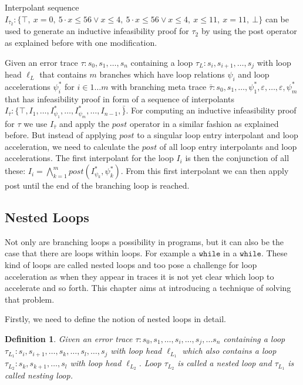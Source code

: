 \documentclass{article}
\newcounter{example}[section]
\newtheorem{mydef}{Definition}
\newcommand\mycom[1]{}
\newcommand\mycom[1]{#1}
\newcommand{\ts}[1]{\mycom{\todo[color=green!40,inline]{\small TS: #1}}}
\begin{document}
Interpolant sequence $I_{\bar{\tau}_2}: \{ \top,\ x = 0,\ 5 \cdot x \leq 56 \lor x \leq 4,\ 5 \cdot x \leq 56 \lor x \leq 4,\ x \leq 11,\ x = 11,\ \bot\}$ can be used to generate an inductive infeasibility proof for $\tau_2$ by using the post operator as explained before with one modification. \\ \par
Given an error trace $\tau: s_0, s_1, \ldots, s_n$ containing a loop $\tau_L: s_i, s_{i+1}, \ldots, s_j$ with loop head $\ell_L$ that contains $m$ branches which have loop relations $\psi_i$ and loop accelerations $\psi_{i}^*$ for $i \in 1 \ldots m$ with branching meta trace $\bar{\tau}: s_0, s_1, \ldots, \psi_{1}^*, \varepsilon, \ldots, \varepsilon, \psi_{m}^*$ that has infeasibility proof in form of a sequence of interpolants $I_{\bar{\tau}}: \{\top, I_1, \ldots, I_{\psi_{1}}^*, \ldots, I_{\psi_{m}}^*, \ldots, I_{n - 1}, \bar \}$. For computing an inductive infeasibility proof for $\tau$ we use $I_{\bar{\tau}}$ and apply the $post$ operator in a similar fashion as explained before. But instead of applying $post$ to a singular loop entry interpolant and loop acceleration, we need to calculate the $post$ of all loop entry interpolants and loop accelerations. The first interpolant for the loop $I_i$ is then the conjunction of all these: $I_i = \bigwedge_{k=1}^{m} post(I_{\psi_k}^*, \psi_k^*)$. From this first interpolant we can then apply post until the end of the branching loop is reached.
\ts{Explain why this works.}


\subsection{Nested Loops}
Not only are branching loops a possibility in programs, but it can also be the case that there are loops within loops. For example a $\texttt{while}$ in a $\texttt{while}$. These kind of loops are called nested loops and too pose a challenge for loop acceleration as when they appear in traces it is not yet clear which loop to accelerate and so forth. This chapter aims at introducing a technique of solving that problem. \\ \par

Firstly, we need to define the notion of nested loops in detail.
\begin{mydef}
    Given an error trace $\tau: s_0, s_1, \ldots, s_i, \ldots, s_j, \ldots s_n$ containing a loop \\ $\tau_{L_1}: s_i, s_{i+1}, \ldots, s_k, \ldots, s_l, \ldots, s_j$ with loop head $\ell_{L_1}$ which also contains a loop $\tau_{L_2}: s_k, s_{k+1}, \ldots, s_l$ with loop head $\ell_{L_2}$.
    Loop $\tau_{L_2}$ is called a nested loop and $\tau_{L_1}$ is called nesting loop.
\end{mydef}
\end{document}
